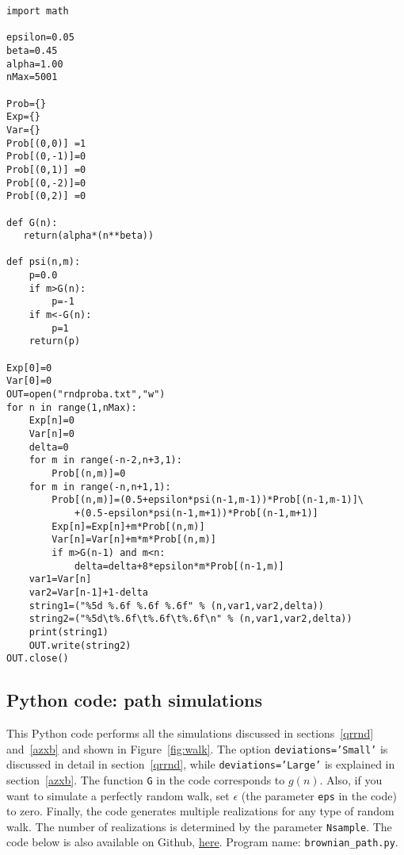 \documentclass[oneside,10pt]{book}
\begin{document}
\begin{lstlisting}
import math

epsilon=0.05
beta=0.45
alpha=1.00
nMax=5001

Prob={}
Exp={}
Var={}
Prob[(0,0)] =1
Prob[(0,-1)]=0
Prob[(0,1)] =0
Prob[(0,-2)]=0
Prob[(0,2)] =0

def G(n):
   return(alpha*(n**beta))

def psi(n,m):
    p=0.0
    if m>G(n):
        p=-1
    if m<-G(n):
        p=1
    return(p)

Exp[0]=0
Var[0]=0
OUT=open("rndproba.txt","w")
for n in range(1,nMax):
    Exp[n]=0
    Var[n]=0
    delta=0
    for m in range(-n-2,n+3,1):
        Prob[(n,m)]=0
    for m in range(-n,n+1,1):
        Prob[(n,m)]=(0.5+epsilon*psi(n-1,m-1))*Prob[(n-1,m-1)]\
            +(0.5-epsilon*psi(n-1,m+1))*Prob[(n-1,m+1)]
        Exp[n]=Exp[n]+m*Prob[(n,m)]
        Var[n]=Var[n]+m*m*Prob[(n,m)]
        if m>G(n-1) and m<n:
            delta=delta+8*epsilon*m*Prob[(n-1,m)]
    var1=Var[n]
    var2=Var[n-1]+1-delta
    string1=("%5d %.6f %.6f %.6f" % (n,var1,var2,delta))
    string2=("%5d\t%.6f\t%.6f\t%.6f\n" % (n,var1,var2,delta))
    print(string1)
    OUT.write(string2)
OUT.close()
\end{lstlisting}


\subsection{Python code: path simulations}\label{paths}

This Python code performs all the simulations discussed in sections~\ref{qrrnd} and~\ref{azxb} and shown in Figure~\ref{fig:walk}. The option
 \texttt{deviations='Small'} is discussed in detail in section~\ref{qrrnd}, while \texttt{deviations='Large'} is
 explained in section~\ref{azxb}. The function \texttt{G} in the code corresponds to $g(n)$. Also, if you want to simulate a perfectly random walk, set $\epsilon$ (the parameter \texttt{eps} in the code) to zero. Finally, the code generates multiple realizations for any type of random walk. The number of realizations is determined by the parameter \texttt{Nsample}.
The code below is also available on Github, \href{https://github.com/VincentGranville/Machine-Learning/blob/main/Source\%20Code/brownian_path.py}{here}.
Program name: \texttt{brownian\_path.py}. \\
\end{document}
